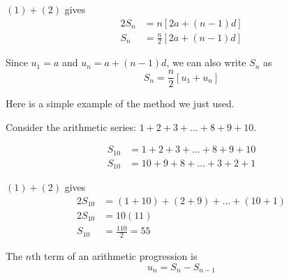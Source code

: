 \documentclass[11pt,a4paper]{book}
\begin{document}
$\left(1\right)+\left(2\right)$ gives
\begin{align*}
2S_{n} & =n\left[2a+\left(n-1\right)d\right]\\
S_{n} & =\frac{n}{2}\left[2a+\left(n-1\right)d\right]
\end{align*}

\begin{tcolorbox}[colback=blue!5, colframe=black,boxrule=.4pt, sharpish corners]

Since $u_{1}=a$ and $u_{n}=a+\left(n-1\right)d$, we can also write
$S_{n}$ as
\[
S_{n}=\frac{n}{2}\left[u_{1}+u_{n}\right]
\]
\end{tcolorbox}

Here is a simple example of the method we just used.

Consider the arithmetic series: $1+2+3+\ldots+8+9+10$.

\begin{align*}
S_{10} & =1+2+3+\ldots+8+9+10\tag{1}\\
S_{10} & =10+9+8+\ldots+3+2+1\tag{2}
\end{align*}

$\left(1\right)+\left(2\right)$ gives
\begin{align*}
2S_{10} & =\left(1+10\right)+\left(2+9\right)+\ldots+\left(10+1\right)\\
2S_{10} & =10\left(11\right)\\
S_{10} & =\frac{110}{2}=55
\end{align*}

\begin{tcolorbox}[colback=blue!5, colframe=black,boxrule=.4pt, sharpish corners]

The $n\text{th}$ term of an arithmetic progression is
\[
u_{n}=S_{n}-S_{n-1}
\]
\end{tcolorbox}
\end{document}

